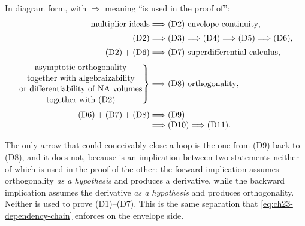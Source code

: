 In diagram form, with $\Longrightarrow$ meaning ``is used in the proof
of'':
\begin{equation}\label{eq:ch27-dependency-diagram}
 \begin{aligned}
  \text{multiplier ideals}
   &\Longrightarrow \textup{(D2)}\ \text{envelope continuity},\\[2pt]
  \textup{(D2)}
   &\Longrightarrow \textup{(D3)}\Longrightarrow \textup{(D4)}
    \Longrightarrow \textup{(D5)}\Longrightarrow \textup{(D6)},\\[2pt]
  \textup{(D2)}+\textup{(D6)}
   &\Longrightarrow \textup{(D7)}\ \text{superdifferential calculus},\\[2pt]
  \left.
   \begin{gathered}
    \text{asymptotic orthogonality}\\[-2pt]
    \text{together with algebraizability}\\[-2pt]
    \text{or differentiability of NA volumes}\\[-2pt]
    \text{together with \textup{(D2)}}
   \end{gathered}
  \right\}
   &\Longrightarrow \textup{(D8)}\ \text{orthogonality},\\[2pt]
  \textup{(D6)}+\textup{(D7)}+\textup{(D8)}
   &\Longrightarrow \textup{(D9)}\\[-1mm]
   &\Longrightarrow \textup{(D10)}\Longrightarrow \textup{(D11)} .
 \end{aligned}
\end{equation}

The only arrow that could conceivably close a loop is the one from
\textup{(D9)} back to \textup{(D8)}, and it does not, because
 is an implication between two
statements neither of which is used in the proof of the other: the forward
implication assumes orthogonality \emph{as a hypothesis} and produces a
derivative, while the backward implication assumes the derivative
\emph{as a hypothesis} and produces orthogonality.  Neither is used to prove
\textup{(D1)}--\textup{(D7)}.  This is the same separation that
\eqref{eq:ch23-dependency-chain} enforces on the envelope side.

\begin{center}
\end{center}

